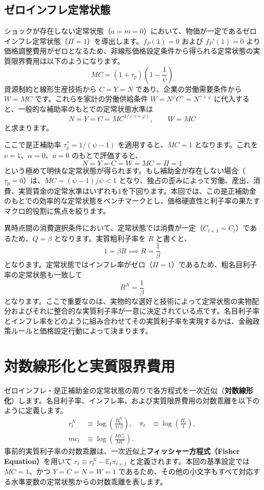\documentclass[
  japanese,
  lualatex,
  ja=standard,
  12pt,
  a4paper]{ltjsarticle}
\begin{document}
\subsection{ゼロインフレ定常状態}\label{ux30bcux30edux30a4ux30f3ux30d5ux30ecux5b9aux5e38ux72b6ux614b}

ショックが存在しない定常状態（\(a=m=0\)）において、物価が一定であるゼロインフレ定常状態（\(\Pi=1\)）を導出します。\(f_P(1)=0\)
および \(f_P'(1)=0\)
より価格調整費用がゼロとなるため、非線形価格設定条件から得られる定常状態の実質限界費用は以下のようになります。
\[
MC
=(1+\tau_p)\left(1-\frac{1}{\psi}\right)
\] 資源制約と線形生産技術から \(C=Y=N\) であり、企業の労働需要条件から
\(W=MC\) です。これらを家計の労働供給条件
\(W=N^\varphi C^\gamma = N^{\gamma+\varphi}\)
に代入すると、一般的な補助率のもとでの定常状態水準は \[
N=Y=C
=MC^{1/(\gamma+\varphi)},
\qquad
W=MC
\] と求まります。

ここで是正補助率 \(\tau_p^*=1/(\psi-1)\) を適用すると、\(MC=1\)
となります。これを \(\nu=1\)、\(\alpha=0\)、\(a=0\) のもとで評価すると、
\[
N=Y=C=W=MC=\Pi=1
\]
という極めて明快な定常状態が得られます。もし補助金が存在しない場合（\(\tau_p=0\)）は、\(MC=(\psi-1)/\psi<1\)
となり、独占の歪みによって労働、産出、消費、実質賃金の定常水準はいずれも1を下回ります。本回では、この是正補助金のもとでの効率的な定常状態をベンチマークとし、価格硬直性と利子率の果たすマクロ的役割に焦点を絞ります。

異時点間の消費選択条件において、定常状態では消費が一定（\(C_{t+1}=C_t\)）であるため、\(Q=\beta\)
となります。実質粗利子率を \(R\) と書くと、 \[
1=\beta R \implies R=\frac{1}{\beta}
\]
となります。定常状態ではインフレ率がゼロ（\(\Pi=1\)）であるため、粗名目利子率の定常状態も一致して
\[
R^N=\frac{1}{\beta}
\]
となります。ここで重要なのは、実物的な選好と技術によって定常状態の実物配分およびそれに整合的な実質利子率が一意に決定されている点です。名目利子率とインフレ率をどのように組み合わせてその実質利子率を実現するかは、金融政策ルールと価格設定行動によって決まります。

\section{対数線形化と実質限界費用}\label{ux5bfeux6570ux7ddaux5f62ux5316ux3068ux5b9fux8ceaux9650ux754cux8cbbux7528}

ゼロインフレ・是正補助金の定常状態の周りで各方程式を一次近似（\textbf{対数線形化}）します。名目利子率、インフレ率、および実質限界費用の対数乖離を以下のように定義します。
\[
\begin{aligned}
r_t^N&\equiv\log\left(\frac{R_t^N}{1/\beta}\right),
&\pi_t&\equiv\log\left(\frac{\Pi_t}{1}\right),\\
mc_t&\equiv\log\left(\frac{MC_t}{MC}\right).
\end{aligned}
\]
事前的実質利子率の対数乖離は、一次近似上\textbf{フィッシャー方程式（Fisher
Equation）}を用いて \(r_t \equiv r_t^N - \mathbb{E}_t \pi_{t+1}\)
と定義されます。本回の基準設定では \(MC=1\)、かつ \(Y=C=N=W=1\)
であるため、その他の小文字もすべて対応する水準変数の定常状態からの対数乖離を表します。
\end{document}
